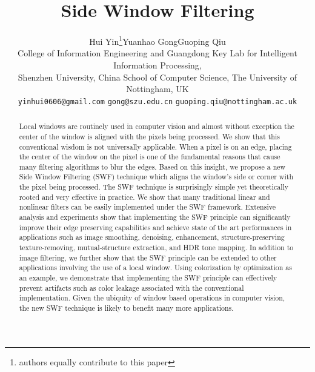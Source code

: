 \documentclass[10pt,twocolumn,letterpaper]{article}
\begin{document}
\title{Side Window Filtering}

\author{Hui Yin\thanks{authors equally contribute to this paper}\quad Yuanhao Gong\quad Guoping Qiu\\
 College of Information Engineering and Guangdong Key Lab for Intelligent Information Processing,\\
Shenzhen University, China  School of Computer Science, The University of Nottingham, UK\\
{\tt\small yinhui0606@gmail.com}
{\tt\small gong@szu.edu.cn}
{\tt\small guoping.qiu@nottingham.ac.uk}
}

\maketitle
\thispagestyle{empty}

\begin{abstract}
   Local windows are routinely used in computer vision and almost without exception the center of the window is aligned with the pixels being processed. We show that this conventional wisdom is not universally applicable. When a pixel is on an edge, placing the center of the window on the pixel is one of the fundamental reasons that cause many filtering algorithms to blur the edges. Based on this insight, we propose a new Side Window Filtering (SWF) technique which aligns the window's side or corner with the pixel being processed. The SWF technique is surprisingly simple yet theoretically rooted and very effective in practice. We show that many traditional linear and nonlinear filters can be easily implemented under the SWF framework. Extensive analysis and experiments show that implementing the SWF principle can significantly improve their edge preserving capabilities and achieve state of the art performances in applications such as image smoothing, denoising, enhancement, structure-preserving texture-removing, mutual-structure extraction, and HDR tone mapping. In addition to image filtering, we further show that the SWF principle can be extended to other applications involving the use of a local window. Using colorization by optimization as an example, we demonstrate that implementing the SWF principle can effectively prevent artifacts such as color leakage associated with the conventional implementation. Given the ubiquity of window based operations in computer vision, the new SWF technique is likely to benefit many more applications.
\end{abstract}
\end{document}

